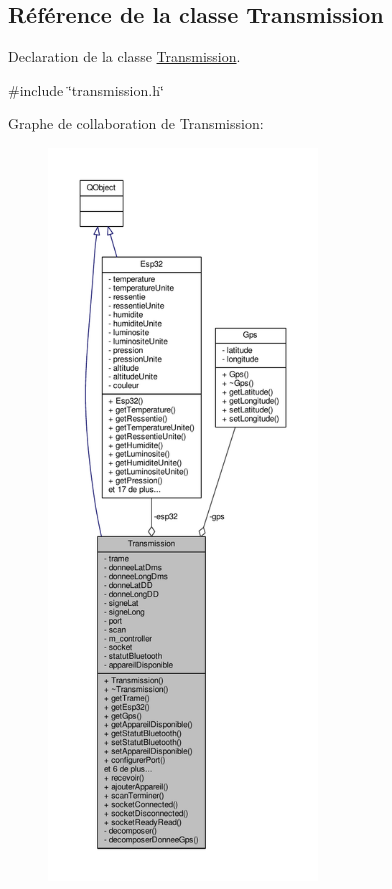 \hypertarget{class_transmission}{}\subsection{Référence de la classe Transmission}
\label{class_transmission}


Declaration de la classe \hyperlink{class_transmission}{Transmission}.  




{\ttfamily \#include \char`\"{}transmission.\+h\char`\"{}}



Graphe de collaboration de Transmission\+:\nopagebreak
\begin{figure}[H]
\begin{center}
\leavevmode
\includegraphics[height=550pt]{class_transmission__coll__graph}
\end{center}
\end{figure}
